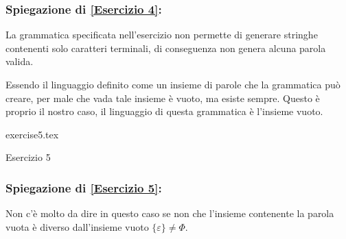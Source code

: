 \documentclass[class=book, crop=false, oneside]{standalone}
\begin{document}
\subsubsection*{Spiegazione di \ref{Esercizio 4}:}
La grammatica specificata nell'esercizio non permette di generare stringhe contenenti solo caratteri terminali, di conseguenza non genera alcuna parola valida.

Essendo il linguaggio definito come un insieme di parole che la grammatica può creare, per male che vada tale insieme è vuoto, ma esiste sempre. Questo è proprio il nostro caso, il linguaggio di questa grammatica è l’insieme vuoto.

\begin{table}[H]
	\centering
	{exercise5.tex}
    \caption{Esercizio 5}
    \label{Esercizio 5}
\end{table}
\subsubsection*{Spiegazione di \ref{Esercizio 5}:}
Non c'è molto da dire in questo caso se non che l’insieme contenente la parola vuota è diverso dall’insieme vuoto $\{\varepsilon\} \neq \Phi$.

\end{document}
